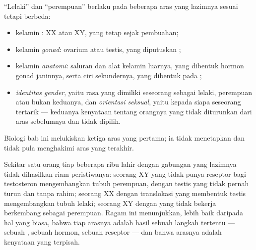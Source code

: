 \begin{proposition}\label{prop:g11:becoming-male-female:levels}
``Lelaki'' dan ``perempuan'' berlaku pada beberapa aras yang lazimnya
sesuai tetapi berbeda:
\begin{itemize}
  \item kelamin \emph{}: XX atau XY, yang tetap sejak
        pembuahan;
  \item kelamin \emph{gonad}: ovarium atau testis, yang diputuskan ;
  \item kelamin \emph{anatomi}: saluran dan alat kelamin luarnya, yang
        dibentuk hormon gonad janinnya, serta ciri sekundernya, yang
        dibentuk pada ;
  \item \emph{identitas gender}, yaitu rasa yang dimiliki seseorang
        sebagai lelaki, perempuan atau bukan keduanya, dan
        \emph{orientasi seksual}, yaitu kepada siapa seseorang tertarik
        --- keduanya kenyataan tentang orangnya yang tidak diturunkan
        dari aras sebelumnya dan tidak dipilih.
\end{itemize}
Biologi bab ini melukiskan ketiga aras yang pertama; ia tidak
menetapkan dan tidak pula menghakimi aras yang terakhir.
\end{proposition}
\admitted

\begin{example}\label{ex:g11:becoming-male-female:disagree}
Sekitar satu orang tiap beberapa ribu lahir dengan gabungan yang
lazimnya tidak dihasilkan riam peristiwanya: seorang XY yang 
tidak punya reseptor bagi testosteron mengembangkan tubuh perempuan,
dengan testis yang tidak pernah turun dan tanpa rahim; seorang XX
dengan translokasi  yang membentuk testis mengembangkan tubuh
lelaki; seorang XY dengan  yang tidak bekerja berkembang sebagai
perempuan. Ragam ini menunjukkan, lebih baik daripada hal yang biasa,
bahwa tiap arasnya adalah hasil sebuah langkah tertentu --- sebuah ,
sebuah hormon, sebuah reseptor --- dan bahwa arasnya adalah kenyataan
yang terpisah.
\end{example}

